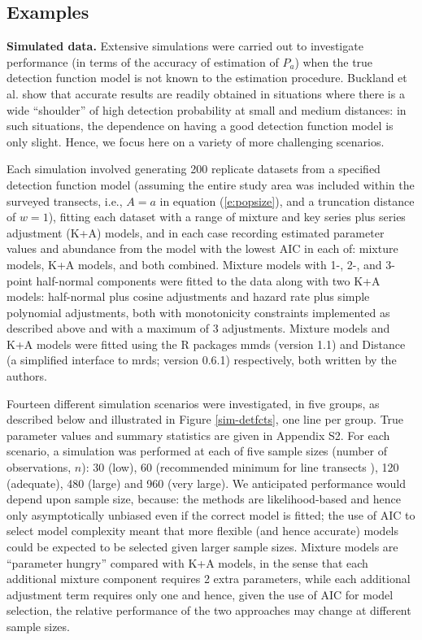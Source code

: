 \documentclass[10pt]{article}
\begin{document}
\subsection*{Examples}

\textbf{Simulated data.} Extensive simulations were carried out to investigate performance (in terms of the accuracy of estimation of $P_a$) when the true detection function model is not known to the estimation procedure. 
 Buckland et al. \cite{Buckland:2001vm} show that accurate results are readily obtained in situations where there is a wide ``shoulder'' of high detection probability at small and medium distances: in such situations, the dependence on having a good detection function model is only slight.  Hence, we focus here on a variety of more challenging scenarios.

Each simulation involved generating 200 replicate datasets from a specified detection function model (assuming the entire study area was included within the surveyed transects, i.e., $A=a$ in equation (\ref{e:popsize}), and a truncation distance of $w=1$), fitting each dataset with a range of mixture and key series plus series adjustment (K+A) models, and in each case recording estimated parameter values and abundance from the model with the lowest AIC in each of: mixture models, K+A models, and both combined.  Mixture models with 1-, 2-, and 3-point half-normal components were fitted to the data along with two K+A models: half-normal plus cosine adjustments and hazard rate plus simple polynomial adjustments, both with monotonicity constraints implemented as described above and with a maximum of 3 adjustments. Mixture models and K+A models were fitted using the R packages mmds (version 1.1) and Distance \cite{Distance} (a simplified interface to mrds; version 0.6.1) respectively, both written by the authors.

Fourteen different simulation scenarios were investigated, in five groups, as described below and illustrated in Figure \ref{sim-detfcts}, one line per group. True parameter values and summary statistics are given in Appendix S2.  For each scenario, a simulation was performed at each of five sample sizes (number of observations, $n$): 30 (low), 60 (recommended minimum for line transects \cite{Buckland:2001vm}), 120 (adequate), 480 (large) and 960 (very large).  We anticipated performance would depend upon sample size, because: the methods are likelihood-based and hence only asymptotically unbiased even if the correct model is fitted; the use of AIC to select model complexity meant that more flexible (and hence accurate) models could be expected to be selected given larger sample sizes. Mixture models are ``parameter hungry'' compared with K+A models, in the sense that each additional mixture component requires 2 extra parameters, while each additional adjustment term requires only one and hence, given the use of AIC for model selection, the relative performance of the two approaches may change at different sample sizes. 
\end{document}
